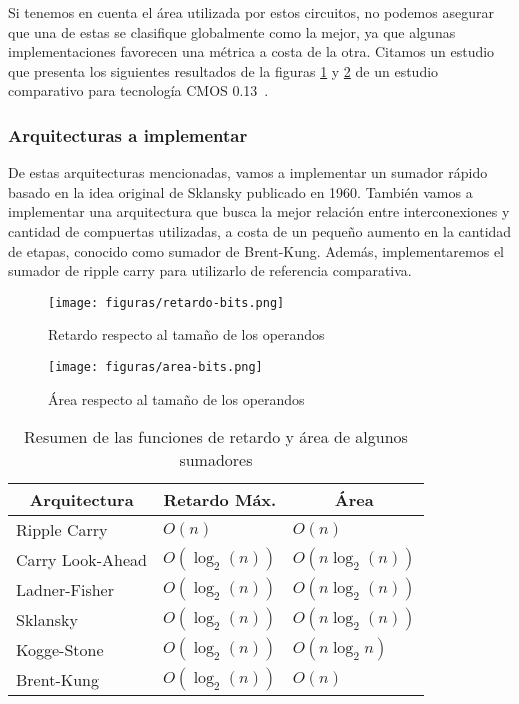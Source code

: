 Si tenemos en cuenta el área utilizada por estos circuitos, no podemos asegurar que una de estas se clasifique globalmente como la mejor, ya que algunas implementaciones favorecen una métrica a costa de la otra. Citamos un estudio que presenta los siguientes resultados de la figuras \ref{retardo-bits} y \ref{area-bits} de un estudio comparativo \cite{estrada-gimenez} para tecnología CMOS 0.13~\microm.

\subsubsection{Arquitecturas a implementar}
De estas arquitecturas mencionadas, vamos a implementar un sumador rápido basado en la idea original de Sklansky\cite{sklansky} publicado en 1960. También vamos a implementar una arquitectura que busca la mejor relación entre interconexiones y cantidad de compuertas utilizadas, a costa de un pequeño aumento en la cantidad de etapas, conocido como sumador de Brent-Kung\cite{brent-kung}. Además, implementaremos el sumador de ripple carry para utilizarlo de referencia comparativa.


\begin{figure}[h]
  \centering
\texttt{[image: figuras/retardo-bits.png]}
\vspace{-5pt}
  \caption{Retardo respecto al tamaño de los operandos}
  \label{retardo-bits}
\vspace{-5pt}
\end{figure}


\begin{figure}[h]
  \centering
\texttt{[image: figuras/area-bits.png]}
\vspace{-1pt}
  \caption{Área respecto al tamaño de los operandos}
  \label{area-bits}
\vspace{-15pt}
\end{figure}

\begin{table}[h]
\centering
\begin{tabular}{|l|l|l|}
\hline
\multicolumn{1}{|c|}{\textbf{Arquitectura}} & \multicolumn{1}{c|}{\textbf{Retardo Máx.   }} & \multicolumn{1}{c|}{\textbf{Área}} \\ \hline
Ripple Carry  & \(O(n)\) & \(O(n)\) \\ \hline
Carry Look-Ahead  & \(O(\log_2(n))\) & \(O(n\log_2(n))\) \\ \hline
Ladner-Fisher &\( O(\log_2(n))\) & \(O(n\log_2(n))   \) \\ \hline
Sklansky &\( O(\log_2(n))\) & \(O(n\log_2(n))\) \\ \hline
Kogge-Stone & \( O(\log_2(n))\) & \(O(n\log_2n)\)\\ \hline
Brent-Kung & $O(\log_2(n))$ & \(O(n)\) \\ \hline
\end{tabular}
\caption{Resumen de las funciones de retardo y área de algunos sumadores}\label{tabla:sumadores}
\end{table}

